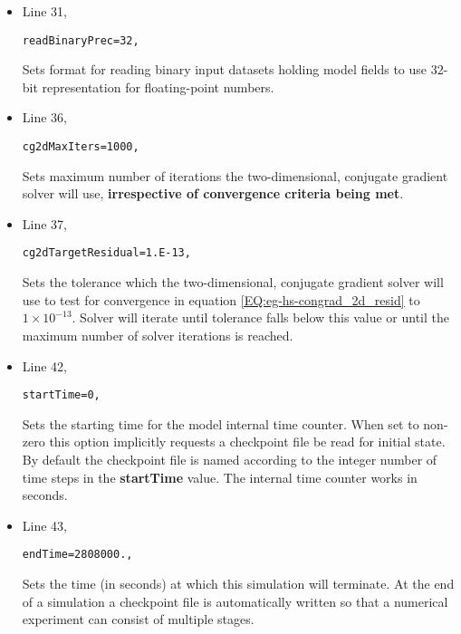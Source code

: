 {\begin{itemize}
\item Line 31,
\begin{verbatim}
readBinaryPrec=32,
\end{verbatim}
Sets format for reading binary input datasets holding model fields to
use 32-bit representation for floating-point numbers.\\

\item Line 36,
\begin{verbatim}
cg2dMaxIters=1000,
\end{verbatim}
Sets maximum number of iterations the two-dimensional, conjugate
gradient solver will use, {\bf irrespective of convergence 
criteria being met}.\\

\item Line 37,
\begin{verbatim}
cg2dTargetResidual=1.E-13,
\end{verbatim}
Sets the tolerance which the two-dimensional, conjugate
gradient solver will use to test for convergence in equation 
\ref{EQ:eg-hs-congrad_2d_resid} to $1 \times 10^{-13}$.
Solver will iterate until 
tolerance falls below this value or until the maximum number of
solver iterations is reached.\\

\item Line 42,
\begin{verbatim}
startTime=0,
\end{verbatim}
Sets the starting time for the model internal time counter.
When set to non-zero this option implicitly requests a 
checkpoint file be read for initial state.
By default the checkpoint file is named according to
the integer number of time steps in the {\bf startTime} value.
The internal time counter works in seconds.

\item Line 43,
\begin{verbatim}
endTime=2808000.,
\end{verbatim}
Sets the time (in seconds) at which this simulation will terminate.
At the end of a simulation a checkpoint file is automatically
written so that a numerical experiment can consist of multiple
stages.


\end{itemize}}

